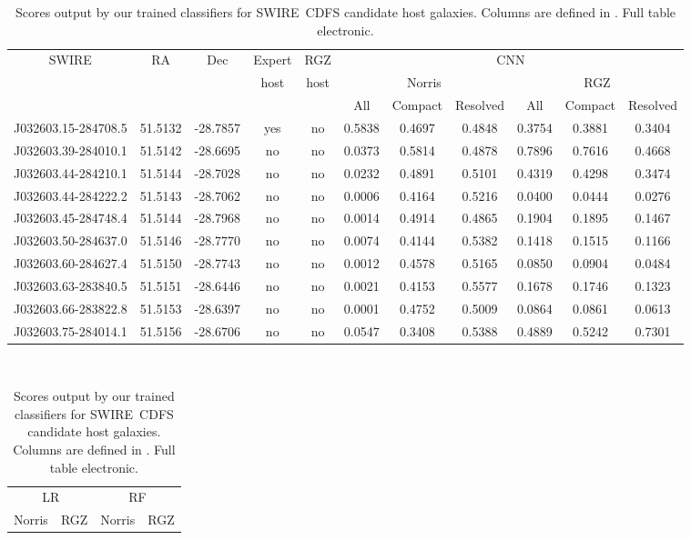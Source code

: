   \begin{table}
    \caption[Scores output by our trained classifiers for SWIRE~CDFS candidate host galaxies.]{Scores output by our trained classifiers for SWIRE~CDFS candidate host galaxies. Columns are defined in . Full table electronic.}
    \label{tab:cdfs-scores}
    \small\centering
    \begin{tabular}{ccccccccccc}
      \hline\hline
SWIRE & RA & Dec & Expert & RGZ & \multicolumn{6}{c}{CNN}\\
& & & host & host & \multicolumn{3}{c}{Norris} & \multicolumn{3}{c}{RGZ}\\
& & & & & All & Compact & Resolved & All & Compact & Resolved\\
      \hline
J032603.15-284708.5 & 51.5132 & -28.7857 & yes & no & 0.5838 & 0.4697 & 0.4848 & 0.3754 & 0.3881 & 0.3404 \\
J032603.39-284010.1 & 51.5142 & -28.6695 & no & no & 0.0373 & 0.5814 & 0.4878 & 0.7896 & 0.7616 & 0.4668 \\
J032603.44-284210.1 & 51.5144 & -28.7028 & no & no & 0.0232 & 0.4891 & 0.5101 & 0.4319 & 0.4298 & 0.3474 \\
J032603.44-284222.2 & 51.5143 & -28.7062 & no & no & 0.0006 & 0.4164 & 0.5216 & 0.0400 & 0.0444 & 0.0276 \\
J032603.45-284748.4 & 51.5144 & -28.7968 & no & no & 0.0014 & 0.4914 & 0.4865 & 0.1904 & 0.1895 & 0.1467 \\
J032603.50-284637.0 & 51.5146 & -28.7770 & no & no & 0.0074 & 0.4144 & 0.5382 & 0.1418 & 0.1515 & 0.1166 \\
J032603.60-284627.4 & 51.5150 & -28.7743 & no & no & 0.0012 & 0.4578 & 0.5165 & 0.0850 & 0.0904 & 0.0484 \\
J032603.63-283840.5 & 51.5151 & -28.6446 & no & no & 0.0021 & 0.4153 & 0.5577 & 0.1678 & 0.1746 & 0.1323 \\
J032603.66-283822.8 & 51.5153 & -28.6397 & no & no & 0.0001 & 0.4752 & 0.5009 & 0.0864 & 0.0861 & 0.0613 \\
J032603.75-284014.1 & 51.5156 & -28.6706 & no & no & 0.0547 & 0.3408 & 0.5388 & 0.4889 & 0.5242 & 0.7301 \\
      \hline\hline
    \end{tabular}\\
    \begin{tabular}{cccccccccccc}
      \hline\hline
\multicolumn{6}{c}{LR} & \multicolumn{6}{c}{RF} \\
\multicolumn{3}{c}{Norris} & \multicolumn{3}{c}{RGZ} & \multicolumn{3}{c}{Norris} & \multicolumn{3}{c}{RGZ} \\

\end{tabular}
\end{table}
